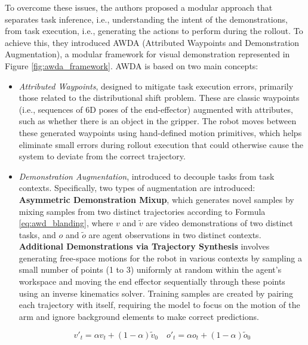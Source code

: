 To overcome these issues, the authors proposed a modular approach that separates task inference, i.e., understanding the intent of the demonstrations, from task execution, i.e., generating the actions to perform during the rollout. To achieve this, they introduced AWDA (Attributed Waypoints and Demonstration Augmentation), a modular framework for visual demonstration represented in Figure \ref{fig:awda_framework}. AWDA is based on two main concepts:

\begin{itemize}
    \item \textit{Attributed Waypoints}, designed to mitigate task execution errors, primarily those related to the distributional shift problem. These are classic waypoints (i.e., sequences of 6D poses of the end-effector) augmented with attributes, such as whether there is an object in the gripper. The robot moves between these generated waypoints using hand-defined motion primitives, which helps eliminate small errors during rollout execution that could otherwise cause the system to deviate from the correct trajectory.
    
    \item \textit{Demonstration Augmentation}, introduced to decouple tasks from task contexts. Specifically, two types of augmentation are introduced: \textbf{Asymmetric Demonstration Mixup}, which generates novel samples by mixing samples from two distinct trajectories according to Formula \ref{eq:awd_blanding}, where $v$ and $\tilde{v}$ are video demonstrations of two distinct tasks, and $o$ and $\tilde{o}$ are agent observations in two distinct contexts. \textbf{Additional Demonstrations via Trajectory Synthesis} involves generating free-space motions for the robot in various contexts by sampling a small number of points (1 to 3) uniformly at random within the agent's workspace and moving the end effector sequentially through these points using an inverse kinematics solver. Training samples are created by pairing each trajectory with itself, requiring the model to focus on the motion of the arm and ignore background elements to make correct predictions.
    
    \begin{equation}
        \label{eq:awd_blanding}
        v'_t = \alpha v_t + (1-\alpha) \tilde{v}_0 \quad o'_t = \alpha o_t + (1-\alpha) \tilde{o}_0
    \end{equation}
    
\end{itemize}


